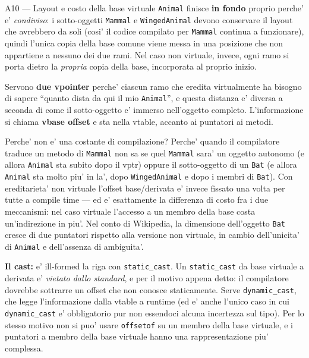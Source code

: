 \documentclass{report}
\newcommand{\code}[1]{\texttt{\small #1}}
\begin{document}
\begin{soluzione}{A10 --- Layout e costo della base virtuale}
\label{sol:A10}
\code{Animal} finisce \textbf{in fondo} proprio perche' e' \emph{condiviso}: i
sotto-oggetti \code{Mammal} e \code{WingedAnimal} devono conservare il layout
che avrebbero da soli (cosi' il codice compilato per \code{Mammal} continua a
funzionare), quindi l'unica copia della base comune viene messa in una posizione
che non appartiene a nessuno dei due rami. Nel caso non virtuale, invece, ogni
ramo si porta dietro la \emph{propria} copia della base, incorporata al proprio
inizio.

Servono \textbf{due vpointer} perche' ciascun ramo che eredita virtualmente ha
bisogno di sapere ``quanto dista da qui il mio \code{Animal}'', e questa
distanza e' diversa a seconda di come il sotto-oggetto e' immerso nell'oggetto
completo. L'informazione si chiama \textbf{vbase offset} e sta nella vtable,
accanto ai puntatori ai metodi.

Perche' non e' una costante di compilazione? Perche' quando il compilatore
traduce un metodo di \code{Mammal} non sa se quel \code{Mammal} sara' un oggetto
autonomo (e allora \code{Animal} sta subito dopo il vptr) oppure il sotto-oggetto
di un \code{Bat} (e allora \code{Animal} sta molto piu' in la', dopo
\code{WingedAnimal} e dopo i membri di \code{Bat}). Con ereditarieta' non
virtuale l'offset base/derivata e' invece fissato una volta per tutte a compile
time --- ed e' esattamente la differenza di costo fra i due meccanismi: nel caso
virtuale l'accesso a un membro della base costa un'indirezione in piu'. Nel
conto di Wikipedia, la dimensione dell'oggetto \code{Bat} cresce di due
puntatori rispetto alla versione non virtuale, in cambio dell'unicita' di
\code{Animal} e dell'assenza di ambiguita'.

\textbf{Il cast:} e' ill-formed la riga con \code{static\_cast}. Un
\code{static\_cast} da base virtuale a derivata e' \emph{vietato dallo
standard}, e per il motivo appena detto: il compilatore dovrebbe sottrarre un
offset che non conosce staticamente. Serve \code{dynamic\_cast}, che legge
l'informazione dalla vtable a runtime (ed e' anche l'unico caso in cui
\code{dynamic\_cast} e' obbligatorio pur non essendoci alcuna incertezza sul
tipo). Per lo stesso motivo non si puo' usare \code{offsetof} su un membro della
base virtuale, e i puntatori a membro della base virtuale hanno una
rappresentazione piu' complessa.
\end{soluzione}
\end{document}
